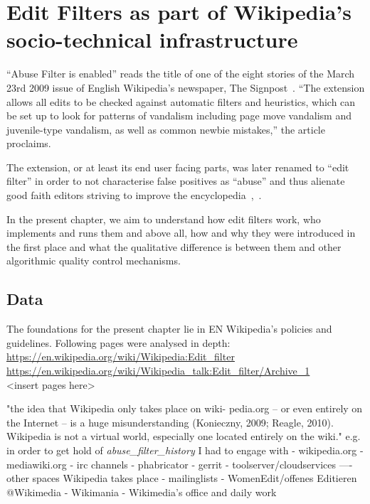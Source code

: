 \chapter{Edit Filters as part of Wikipedia's socio-technical infrastructure}
\label{chap:filters}


``Abuse Filter is enabled'' reads the title of one of the eight stories of the March 23rd 2009 issue of English Wikipedia's newspaper, The Signpost~\cite{Signpost2009}.
``The extension allows all edits to be checked against automatic filters and heuristics, which can be set up to look for patterns of vandalism including page move vandalism and juvenile-type vandalism, as well as common newbie mistakes,'' the article proclaims.

The extension, or at least its end user facing parts, was later renamed to ``edit filter'' in order to not characterise false positives as ``abuse'' and thus alienate good faith editors striving to improve the encyclopedia~\cite{Wikipedia:EditFilter},~\cite{Wikipedia:EditFilterTalkArchiveNameChange}.

In the present chapter, we aim to understand how edit filters work, who implements and runs them and above all, how and why they were introduced in the first place and what the qualitative difference is between them and other algorithmic quality control mechanisms.

\section{Data}

The foundations for the present chapter lie in EN Wikipedia's policies and guidelines.
Following pages were analysed in depth: \\
\url{https://en.wikipedia.org/wiki/Wikipedia:Edit_filter} \\
\url{https://en.wikipedia.org/wiki/Wikipedia_talk:Edit_filter/Archive_1} \\
<insert pages here>

\cite{Geiger2014}
"the idea that Wikipedia only takes place on wiki-
pedia.org – or even entirely on the Internet – is a huge misunderstanding (Konieczny, 2009;
Reagle, 2010). Wikipedia is not a virtual world, especially one located entirely on the wiki."
e.g. in order to get hold of \emph{abuse\_filter\_history} I had to engage with
- wikipedia.org
- mediawiki.org
- irc channels
- phabricator
- gerrit
- toolserver/cloudservices
----
other spaces Wikipedia takes place
- mailinglists
- WomenEdit/offenes Editieren @Wikimedia
- Wikimania
- Wikimedia's office and daily work

